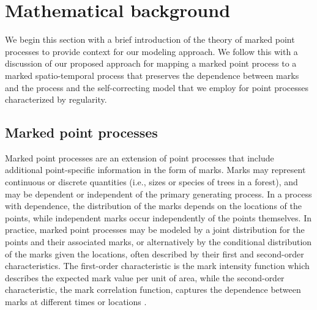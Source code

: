 \section{Mathematical background}\label{sec:background}

We begin this section with a brief introduction of the theory of marked
point processes to provide context for our modeling approach. We follow
this with a discussion of our proposed approach for mapping a marked
point process to a marked spatio-temporal process that preserves the
dependence between marks and the process and the self-correcting model
that we employ for point processes characterized by regularity.

\subsection{Marked point processes}\label{mpp}

Marked point processes are an extension of point processes that include
additional point-specific information in the form of marks. Marks may
represent continuous or discrete quantities (i.e., sizes or species of
trees in a forest), and may be dependent or independent of the primary
generating process. In a process with dependence, the distribution of
the marks depends on the locations of the points, while independent
marks occur independently of the points themselves. In practice, marked
point processes may be modeled by a joint distribution for the points
and their associated marks, or alternatively by the conditional
distribution of the marks given the locations, often described by their
first and second-order characteristics. The first-order characteristic
is the mark intensity function which describes the expected mark value
per unit of area, while the second-order characteristic, the mark
correlation function, captures the dependence between marks at different
times or locations \citep{schlatherDetectingDependenceMarks2004}.

